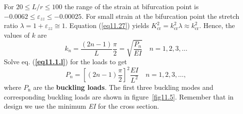 \documentclass{AeroStructure-ERJohnson}
\begin{document}
\begin{example}
\begin{table}
\vspace*{-1pc}
\end{table}

\noindent For $ 20 \leq L/r \leq 100 $ the range of the strain at bifurcation point is $ -0.0062 \leq \varepsilon_{z z} \leq-0.00025 $. For small strain at the bifurcation point the stretch ratio $ \lambda=1+\varepsilon_{zz} \cong 1 $. Equation (\ref{eq11.27}) yields ${K}_{\mathrm{cr}}^{2}=k_{\mathrm{cr}}^{2} \lambda \approx k_{\mathrm{cr}}^{2}$. Hence, the values of $k$ are
\begin{equation}
k_{n}=\frac{(2 n-1)}{L} \frac{\pi}{2}=\sqrt{\frac{P_{n}}{E I}} \quad n=1,2,3, \ldots \label{eq11.1.l}\tag{l}
\end{equation}
Solve eq. (\textbf{\ref{eq11.1.l}}) for the loads to get
\begin{equation}
P_{n}=\left[(2 n-1) \frac{\pi}{2}\right]^{2} \frac{E I}{L^{2}} \quad n=1,2,3, \ldots , \label{eq11.1.m}\tag{m}
\end{equation}
where $P_{\textrm{n}}$ are the \textbf{buckling loads}. The first three buckling modes and corresponding buckling loads are shown in figure~\ref{fig11.5}. Remember that in design we use the minimum \textit{EI} for the cross section.
\end{example}
\end{document}
